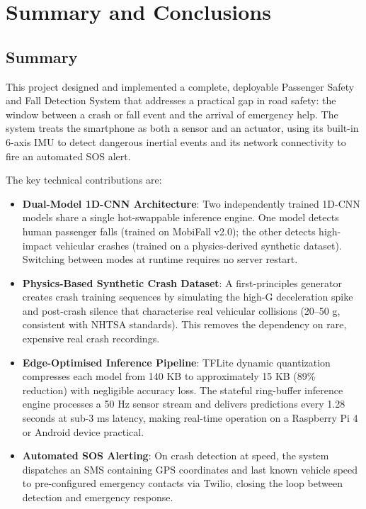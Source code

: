 \chapter{Summary and Conclusions}
\label{sec:5}

\section{Summary}
\label{sec:summary}

This project designed and implemented a complete, deployable Passenger Safety and Fall Detection System that addresses a practical gap in road safety: the window between a crash or fall event and the arrival of emergency help. The system treats the smartphone as both a sensor and an actuator, using its built-in 6-axis IMU to detect dangerous inertial events and its network connectivity to fire an automated SOS alert.

The key technical contributions are:

\begin{itemize}
    \item \textbf{Dual-Model 1D-CNN Architecture}: Two independently trained 1D-CNN models share a single hot-swappable inference engine. One model detects human passenger falls (trained on MobiFall v2.0); the other detects high-impact vehicular crashes (trained on a physics-derived synthetic dataset). Switching between modes at runtime requires no server restart.

    \item \textbf{Physics-Based Synthetic Crash Dataset}: A first-principles generator creates crash training sequences by simulating the high-G deceleration spike and post-crash silence that characterise real vehicular collisions (20--50 g, consistent with NHTSA standards). This removes the dependency on rare, expensive real crash recordings.

    \item \textbf{Edge-Optimised Inference Pipeline}: TFLite dynamic quantization compresses each model from 140 KB to approximately 15 KB (89\% reduction) with negligible accuracy loss. The stateful ring-buffer inference engine processes a 50 Hz sensor stream and delivers predictions every 1.28 seconds at sub-3 ms latency, making real-time operation on a Raspberry Pi 4 or Android device practical.

    \item \textbf{Automated SOS Alerting}: On crash detection at speed, the system dispatches an SMS containing GPS coordinates and last known vehicle speed to pre-configured emergency contacts via Twilio, closing the loop between detection and emergency response.
\end{itemize}

